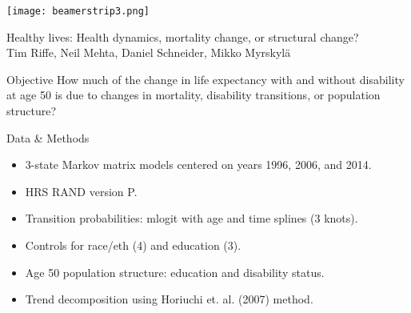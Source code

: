 \documentclass[20pt,usenames,dvipsnames]{beamer}
\begin{document}

\begin{frame}[plain]
	\vspace{-3cm}
 \centerline{\texttt{[image: beamerstrip3.png]}}

	
	\huge
	\vspace{1em}
	
	Healthy lives: Health dynamics, mortality change, or structural change?\\
	\vspace{1em}
	\large 
	Tim Riffe, Neil Mehta, Daniel Schneider, Mikko Myrskyl\"a 
\end{frame}
\begin{frame}[plain]
\Large
\begin{block}{Objective}
How much of the change in life expectancy with and without disability at age 50 is due to changes in mortality, disability transitions, or population structure?
\end{block}
\end{frame}
\begin{frame}[plain]
\Large
\begin{block}{Data \& Methods}
\begin{itemize}[<+->]
\item 3-state Markov matrix models centered on years 1996, 2006, and 2014. 
\item HRS RAND version P. 
\item Transition probabilities: mlogit with age and time splines (3 knots).
\item Controls for race/eth (4) and education (3). 
\item Age 50 population structure: education and disability status.
\item Trend decomposition using Horiuchi et. al. (2007) method.
\end{itemize}
\end{block}
\end{frame}
\end{document}
